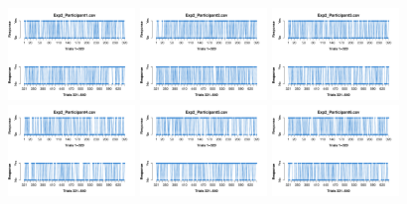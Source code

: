 \begin{itemize}
\begin{figure}[th]
\centering
\includegraphics[width=0.30\textwidth]{Figures/Response_Exp2_P1} \includegraphics[width=0.30\textwidth]{Figures/Response_Exp2_P2} \includegraphics[width=0.30\textwidth]{Figures/Response_Exp2_P3}
\includegraphics[width=0.30\textwidth]{Figures/Response_Exp2_P4} \includegraphics[width=0.30\textwidth]{Figures/Response_Exp2_P5} \includegraphics[width=0.30\textwidth]{Figures/Response_Exp2_P6}

\end{figure}
\end{itemize}
